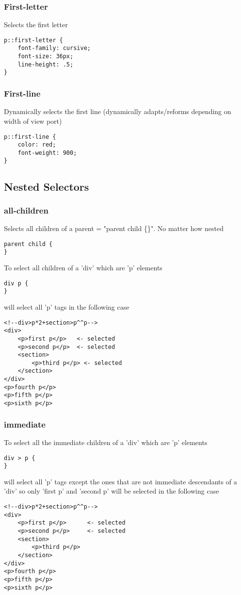 \documentclass[]{article}
\newcommand{\<}{\guilsinglleft}
\renewcommand{\>}{\guilsinglright}
\begin{document}
\subsubsection{First-letter}
Selects the first letter
\begin{lstlisting}
p::first-letter {
	font-family: cursive;
	font-size: 36px;
	line-height: .5;
}
\end{lstlisting}

\subsubsection{First-line}
Dynamically selects the first line (dynamically adapts/reforms depending on width of view port)
\begin{lstlisting}
p::first-line {
	color: red;
	font-weight: 900;
}
\end{lstlisting}

\subsection{Nested Selectors}
\subsubsection{all-children}
Selects all children of a parent = "parent child \{\}".  No matter how nested 
\begin{lstlisting}
parent child {
}
\end{lstlisting}
To select all children of a 'div' which are 'p' elements 
\begin{lstlisting}
div p {
}
\end{lstlisting}
will select all 'p' tags in the following case
\begin{lstlisting}
<!--div>p*2+section>p^^p-->
<div>
	<p>first p</p>   <- selected 
	<p>second p</p>  <- selected 
	<section>
		<p>third p</p> <- selected 
	</section>
</div>
<p>fourth p</p>
<p>fifth p</p>
<p>sixth p</p>
\end{lstlisting}

\subsubsection{immediate}
To select all the immediate children of a 'div' which are 'p' elements 
\begin{lstlisting}
div > p {
}
\end{lstlisting}
will select all 'p' tags except the ones that are not immediate descendants of a 'div' so only 'first p' and 'second p' will be selected in the following case
\begin{lstlisting}
<!--div>p*2+section>p^^p-->
<div>
	<p>first p</p>      <- selected 
	<p>second p</p>     <- selected
	<section>
		<p>third p</p>
	</section>
</div>
<p>fourth p</p>
<p>fifth p</p>
<p>sixth p</p>
\end{lstlisting}
\end{document}
